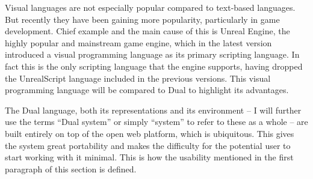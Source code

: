 Visual languages are not especially popular compared to text-based languages. But recently they have been gaining more popularity, particularly in game development. Chief example and the main cause of this is Unreal Engine, the highly popular and mainstream\cite{unreal_list, unreal_guinness} game engine, which in the latest version introduced a visual programming language\cite{blueprint} as its primary scripting language. In fact this is the only scripting language that the engine supports, having dropped the UnrealScript language\cite{unreal_script} included in the previous versions. This visual programming language will be compared to Dual to highlight its advantages.

The Dual language, both its representations and its environment -- I will further use the terms ``Dual system'' or simply ``system'' to refer to these as a whole -- are built entirely on top of the open web platform\cite{open_web_platform}, which is ubiquitous. This gives the system great portability and makes the difficulty for the potential user to start working with it minimal. This is how the usability mentioned in the first paragraph of this section is defined.

